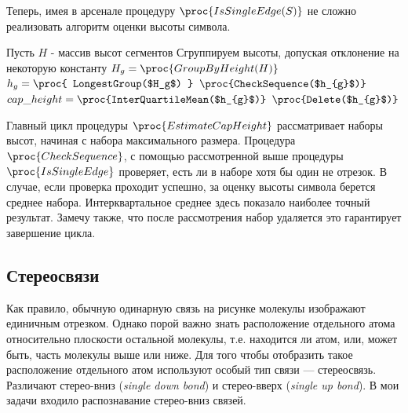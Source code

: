 \noindent
Теперь, имея в арсенале процедуру $\proc{IsSingleEdge(S)}$ не сложно реализовать алгоритм оценки высоты символа. 

\begin{codebox}
  \li \Comment Пусть $H$ - массив высот сегментов
  \li
  \li \Comment Сгруппируем высоты, допуская отклонение на некоторую константу
  \li $ H_{g} = \proc{GroupByHeight(H)} $
  \li
  \li \Repeat 
  \li $ h_{g} = \proc{ LongestGroup($H_g$) } $
  \li \If $ \proc{CheckSequence($h_{g}$)} $
  \li \Then $cap\_height = \proc{InterQuartileMean($h_{g}$)} $
  \li \Return \End
  \li $\proc{Delete($h_{g}$)}$
  \li \Until {} \End
\end{codebox}

\noindent
Главный цикл процедуры $\proc{EstimateCapHeight}$ рассматривает наборы высот, начиная с набора максимального размера. Процедура 
$\proc{CheckSequence}$, с помощью рассмотренной выше процедуры $\proc{IsSingleEdge}$ проверяет, есть ли в наборе хотя бы один не отрезок.
В случае, если проверка проходит успешно, за оценку высоты символа берется среднее набора. 
Интерквартальное среднее здесь показало наиболее точный результат. Замечу также, что после рассмотрения набор удаляется это гарантирует завершение
цикла.

\subsection{Стереосвязи}
\label{subsec:stereobonds}

Как правило, обычную одинарную связь на рисунке молекулы изображают единичным отрезком. Однако порой важно знать расположение
отдельного атома относительно плоскости остальной молекулы, т.е. находится ли атом, или, может быть, часть молекулы выше или ниже. 
Для того чтобы отобразить такое расположение отдельного атом используют особый тип связи --- стереосвязь. Различают стерео-вниз 
(\emph{single down bond}) и стерео-вверх (\emph{single up bond}). В мои задачи входило распознавание стерео-вниз связей. \\

